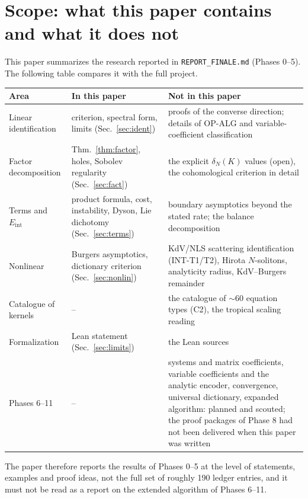 \documentclass[11pt,a4paper]{article}
\theoremstyle{definition}
\newcommand{\Eint}{E_{\mathrm{int}}}
\begin{document}
\section{Scope: what this paper contains and what it does not}\label{app:scope}
This paper summarizes the research reported in \texttt{REPORT\_FINALE.md} (Phases 0--5). The following table compares it with the full project.
\begin{center}\small
\begin{tabular}{@{}L{4.4cm}L{5.6cm}L{4.6cm}@{}}
\toprule
Area & In this paper & Not in this paper\\\midrule
Linear identification & criterion, spectral form, limits (Sec.~\ref{sec:ident}) & proofs of the converse direction; details of OP-ALG and variable-coefficient classification\\
Factor decomposition & Thm.~\ref{thm:factor}, holes, Sobolev regularity (Sec.~\ref{sec:fact}) & the explicit $\delta_N(K)$ values (open), the cohomological criterion in detail\\
Terms and $\Eint$ & product formula, cost, instability, Dyson, Lie dichotomy (Sec.~\ref{sec:terms}) & boundary asymptotics beyond the stated rate; the balance decomposition\\
Nonlinear & Burgers asymptotics, dictionary criterion (Sec.~\ref{sec:nonlin}) & KdV/NLS scattering identification (INT-T1/T2), Hirota $N$-solitons, analyticity radius, KdV--Burgers remainder\\
Catalogue of kernels & -- & the catalogue of $\sim$60 equation types (C2), the tropical scaling reading\\
Formalization & Lean statement (Sec.~\ref{sec:limits}) & the Lean sources\\
Phases 6--11 & -- & systems and matrix coefficients, variable coefficients and the analytic encoder, convergence, universal dictionary, expanded algorithm: planned and scouted; the proof packages of Phase 8 had not been delivered when this paper was written\\
\bottomrule
\end{tabular}
\end{center}
The paper therefore reports the results of Phases 0--5 at the level of statements, examples and proof ideas, not the full set of roughly 190 ledger entries, and it must not be read as a report on the extended algorithm of Phases 6--11.
\end{document}
